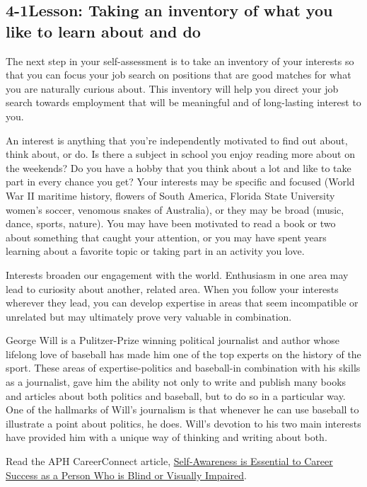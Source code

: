 \pagebreak \subsection*{4-1\quad Lesson: Taking an inventory of what you like to learn about and do}
The next step in your self-assessment is to take an inventory of your interests so that you can focus your job search on positions that are good matches for what you are naturally curious about. This inventory will help you direct your job search towards employment that will be meaningful and of long-lasting interest to you.

An interest is anything that you're independently motivated to find out about, think about, or do. Is there a subject in school you enjoy reading more about on the weekends? Do you have a hobby that you think about a lot and like to take part in every chance you get? Your interests may be specific and focused (World War II maritime history, flowers of South America, Florida State University women's soccer, venomous snakes of Australia), or they may be broad (music, dance, sports, nature). You may have been motivated to read a book or two about something that caught your attention, or you may have spent years learning about a favorite topic or taking part in an activity you love.

Interests broaden our engagement with the world. Enthusiasm in one area may lead to curiosity about another, related area. When you follow your interests wherever they lead, you can develop expertise in areas that seem incompatible or unrelated but may ultimately prove very valuable in combination.

George Will is a Pulitzer-Prize winning political journalist and author whose lifelong love of baseball has made him one of the top experts on the history of the sport. These areas of expertise-politics and baseball-in combination with his skills as a journalist, gave him the ability not only to write and publish many books and articles about both politics and baseball, but to do so in a particular way. One of the hallmarks of Will's journalism is that whenever he can use baseball to illustrate a point about politics, he does. Will's devotion to his two main interests have provided him with a unique way of thinking and writing about both.

Read the APH CareerConnect article, \href{https://aphconnectcenter.org/careerconnect-blog/self-awareness-is-essential-to-career-success/}{Self-Awareness is Essential to Career Success as a Person Who is Blind or Visually Impaired}.

